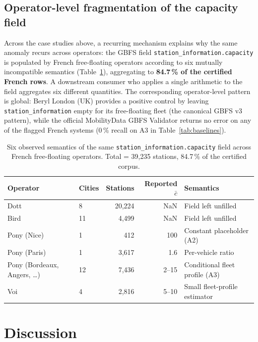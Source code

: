 \documentclass[11pt,a4paper]{article}
\begin{document}
\subsection{Operator-level fragmentation of the capacity field}\label{secConsequences}
Across the case studies above, a recurring mechanism explains why
the same anomaly recurs across operators: the GBFS field
\texttt{station\_information.capacity} is populated by French
free-floating operators according to six mutually incompatible
semantics (Table~\ref{tab:capacity-semantics}), aggregating to
\textbf{84.7\,\% of the certified French rows}. A downstream
consumer who applies a single arithmetic to the field aggregates
six different quantities. The corresponding operator-level pattern
is global: Beryl London (UK) provides a positive control by leaving
\texttt{station\_information} empty for its free-floating fleet
(the canonical GBFS v3 pattern), while the official MobilityData
GBFS Validator \cite{MobilityData2024Validator} returns no error
on any of the flagged French systems (0\,\% recall on A3 in
Table~\ref{tab:baselines}).

\begin{table}[ht]
\centering
\caption{Six observed semantics of the same
\texttt{station\_information.capacity} field across French
free-floating operators. Total = 39{,}235 stations, 84.7\,\% of the
certified corpus.}
\label{tab:capacity-semantics}
\small
\begin{tabular}{@{}llrrl@{}}
\toprule
\textbf{Operator} & \textbf{Cities} & \textbf{Stations} & \textbf{Reported $\bar c$} & \textbf{Semantics}\\
\midrule
Dott         & 8  & 20{,}224 & NaN  & Field left unfilled \\
Bird         & 11 &  4{,}499 & NaN  & Field left unfilled \\
Pony (Nice)  & 1  &     412  & 100  & Constant placeholder (A2) \\
Pony (Paris) & 1  &  3{,}617 & 1.6  & Per-vehicle ratio \\
Pony (Bordeaux, Angers, \dots) & 12 &  7{,}436 & 2--15 & Conditional fleet profile (A3) \\
Voi          & 4  &  2{,}816 & 5--10 & Small fleet-profile estimator \\
\bottomrule
\end{tabular}
\end{table}

\section{Discussion}\label{secDiscussion}
\end{document}
